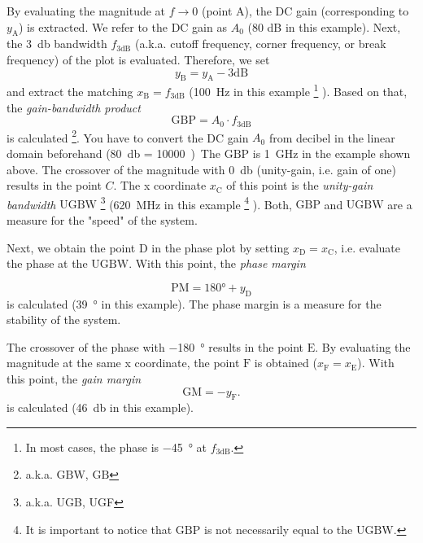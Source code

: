 \documentclass{article}[11pt]
\begin{document}
\medskip

By evaluating the magnitude at $f \rightarrow 0$ (point $\mathrm{A}$), the
DC gain (corresponding to $y_{\mathrm{A}}$) is extracted.
We refer to the DC gain as $A_0$ (80 dB in this example).
Next, the \SI{3}{\decibel} bandwidth $f_{\mathrm{3dB}}$ 
(a.k.a. cutoff frequency, corner frequency, or break frequency) of the
plot is evaluated. 
Therefore, we set
$$
y_{\mathrm{B}} = y_{\mathrm{A}} - 3 \mathrm{dB}
$$
and extract the matching $x_{\mathrm{B}} = f_{\mathrm{3dB}}$ 
(\SI{100}{\hertz} in this example%
\footnote{In most cases, the phase is \SI{-45}{\degree} at
$f_{\mathrm{3dB}}$.}
).
Based on that, the \textit{gain-bandwidth product}
\begin{equation}
\mathrm{GBP} = A_0 \cdot f_{\mathrm{3dB}}
\end{equation}
is calculated%
\footnote{a.k.a. $\mathrm{GBW}$, $\mathrm{GB}$}. 
You have to convert the DC gain $A_0$ from decibel in the linear domain 
beforehand (\SI{80}{\decibel} = \qty{10000}).
The $\mathrm{GBP}$ is \SI{1}{\giga\hertz} in the example shown above.
The crossover of the magnitude with \SI{0}{\decibel} 
(unity-gain, i.e. gain of one) results in the point $C$.
The x coordinate $x_{\mathrm{C}}$ of this point is the 
\textit{unity-gain bandwidth}
$\mathrm{UGBW}$%
\footnote{a.k.a. UGB, UGF}
(\SI{620}{\mega\hertz} in this example%
\footnote{It is important to notice that $\mathrm{GBP}$ is not necessarily
equal to the $\mathrm{UGBW}$.}
).
Both, $\mathrm{GBP}$ and $\mathrm{UGBW}$ are a measure for the "speed" of
the system.

\medskip

Next, we obtain the point $\mathrm{D}$ in the phase plot by setting 
$x_{\mathrm{D}} = x_{\mathrm{C}}$, i.e. evaluate the phase at the 
$\mathrm{UGBW}$.
With this point, the \textit{phase margin}

$$
\mathrm{PM} = 180° + y_{\mathrm{D}}
$$
is calculated (\SI{39}{\degree} in this example).
The phase margin is a measure for the stability of the system.

The crossover of the phase with \SI{-180}{\degree} results in the 
point $\mathrm{E}$.
By evaluating the magnitude at the same x coordinate, the point 
$\mathrm{F}$ is obtained ($x_{\mathrm{F}} = x_{\mathrm{E}}$).
With this point, the \textit{gain margin}
$$
\mathrm{GM} = - y_{\mathrm{F}}.
$$
is calculated (\SI{46}{\decibel} in this example).

\printbibliography
\end{document}
